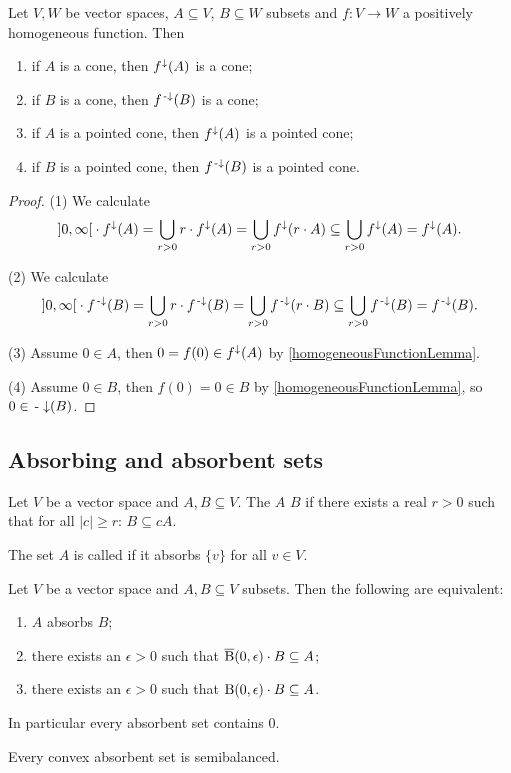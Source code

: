 \begin{lemma} \label{mappingConeToCone}
Let $V,W$ be vector spaces, $A\subseteq V$, $B\subseteq W$ subsets and $f:V\to W$ a positively homogeneous function. Then
\begin{enumerate}
\item if $A$ is a cone, then $f^\downarrow(A)$ is a cone;
\item if $B$ is a cone, then $f^{\text{\hspace{0.15em}-}\downarrow}(B)$ is a cone;
\item if $A$ is a pointed cone, then $f^\downarrow(A)$ is a pointed cone;
\item if $B$ is a pointed cone, then $f^{\text{\hspace{0.15em}-}\downarrow}(B)$ is a pointed cone.
\end{enumerate}
\end{lemma}
\begin{proof}
(1) We calculate
\[ \interval[o]{0,\infty}\cdot f^\imf(A) = \bigcup_{r>0}r\cdot f^\imf(A) = \bigcup_{r>0}f^\imf(r\cdot A) \subseteq \bigcup_{r>0}f^\imf(A) = f^\imf(A). \]

(2) We calculate
\[ \interval[o]{0,\infty}\cdot f^\preimf(B) = \bigcup_{r>0}r\cdot f^\preimf(B) = \bigcup_{r>0}f^\preimf(r\cdot B) \subseteq \bigcup_{r>0}f^\preimf(B) = f^\preimf(B). \]

(3) Assume $0\in A$, then $0 = f(0)\in f^\downarrow(A)$ by \ref{homogeneousFunctionLemma}.

(4) Assume $0\in B$, then $f(0) = 0\in B$ by \ref{homogeneousFunctionLemma}, so $0\in {\text{\hspace{0.15em}-}\downarrow}(B)$.
\end{proof}

\subsection{Absorbing and absorbent sets}
\begin{definition}
Let $V$ be a vector space and $A,B\subseteq V$. The $A$  $B$ if there exists a real $r>0$ such that for all $|c| \geq r$: $B\subseteq cA$.

The set $A$ is called  if it absorbs $\{v\}$ for all $v\in V$.
\end{definition}

\begin{lemma} \label{absorbingSetLemma}
Let $V$ be a vector space and $A, B\subseteq V$ subsets. Then the following are equivalent:
\begin{enumerate}
\item $A$ absorbs $B$;
\item there exists an $\epsilon>0$ such that $\operatorname{\overline{B}}(0,\epsilon)\cdot B\subseteq A$;
\item there exists an $\epsilon>0$ such that $\operatorname{B}(0,\epsilon)\cdot B\subseteq A$.
\end{enumerate}
In particular every absorbent set contains $0$.
\end{lemma}
\begin{corollary} \label{convexAbsorbentImpliesSemibalanced}
Every convex absorbent set is semibalanced.
\end{corollary}


